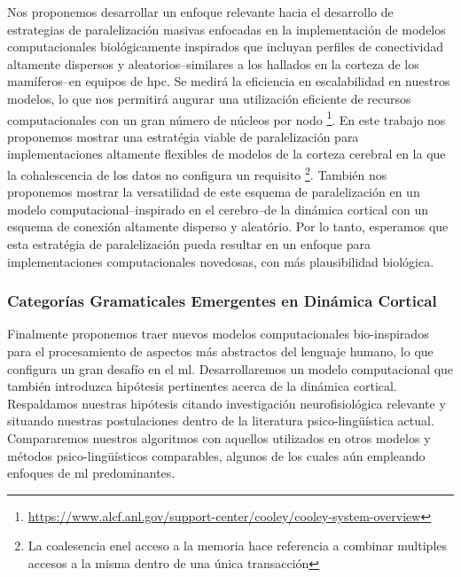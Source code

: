 Nos proponemos desarrollar un enfoque relevante hacia el desarrollo de estrategias de paralelización masivas enfocadas en la implementación de modelos computacionales biológicamente inspirados que incluyan perfiles de conectividad altamente dispersos y aleatorios--similares a los hallados en la corteza de los mamíferos--en equipos de \gls{hpc}.
Se medirá la eficiencia en escalabilidad en nuestros modelos, lo que nos permitirá augurar una utilización eficiente de recursos computacionales con un gran número de núcleos por nodo \footnote{\url{https://www.alcf.anl.gov/support-center/cooley/cooley-system-overview}}.
En este trabajo nos proponemos mostrar una estratégia viable de paralelización para implementaciones altamente flexibles de modelos de la corteza cerebral en la que la cohalescencia de los datos no configura un requisito \footnote{La coalesencia enel acceso a la memoria hace referencia a combinar multiples accesos a la misma dentro de una única transacción}.
También nos proponemos mostrar la versatilidad de este esquema de paralelización en un modelo computacional--inspirado en el cerebro--de la dinámica cortical con un esquema de conexión altamente disperso y aleatório.
Por lo tanto, esperamos que esta estratégia de paralelización pueda resultar en un enfoque para implementaciones computacionales novedosas, con más plausibilidad biológica.




\subsubsection{Categorías Gramaticales Emergentes en Dinámica Cortical}

Finalmente proponemos traer nuevos modelos computacionales bio-inspirados para el procesamiento de aspectos más abstractos del lenguaje humano,
lo que configura un gran desafío en el \gls{ml}.
Desarrollaremos un modelo computacional que también introduzca hipótesis pertinentes acerca de la dinámica cortical.
Respaldamos nuestras hipótesis citando investigación neurofisiológica relevante y situando nuestras postulaciones dentro de la literatura psico-lingüística actual.
Compararemos nuestros algoritmos con aquellos utilizados en otros modelos y métodos psico-lingüísticos comparables, algunos de los cuales aún empleando enfoques de \gls{ml} predominantes. 

